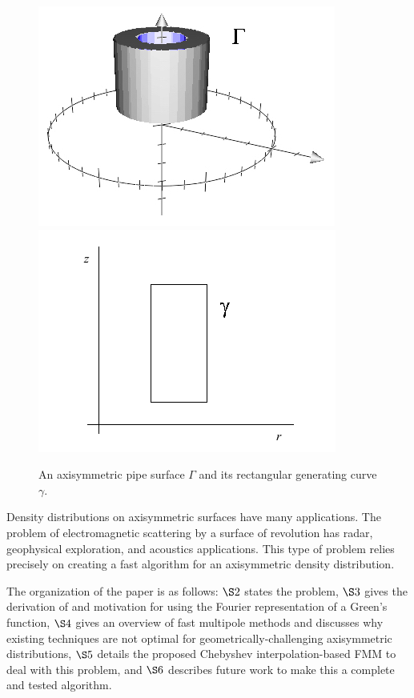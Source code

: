\documentclass[11pt, oneside]{article}   	%
\begin{document}
\begin{figure}[h]
\caption{An axisymmetric pipe surface $\Gamma$ and its rectangular generating curve $\gamma$.}
\label{fig:3}
\centering
\includegraphics[scale=0.5]{pipe2}
\includegraphics[scale=0.5]{rect}
\end{figure}

Density distributions on axisymmetric surfaces have many applications. The problem of electromagnetic scattering by a surface of revolution has radar, geophysical exploration, and acoustics applications. This type of problem relies precisely on creating a fast algorithm for an axisymmetric density distribution.

The organization of the paper is as follows: $\S2$ states the problem, $\S3$ gives the derivation of and motivation for using the Fourier representation of a Green's function, $\S4$ gives an overview of fast multipole methods and discusses why existing techniques are not optimal for geometrically-challenging axisymmetric distributions, $\S5$ details the proposed Chebyshev interpolation-based FMM to deal with this problem, and $\S6$ describes future work to make this a complete and tested algorithm.
\end{document}
